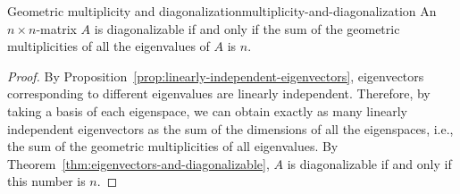 \begin{proposition}{Geometric multiplicity and diagonalization}{multiplicity-and-diagonalization}
  An $n\times n$-matrix $A$ is diagonalizable if and only if the sum
  of the geometric multiplicities of all the eigenvalues of $A$ is
  $n$.
\end{proposition}

\begin{proof}
  By Proposition~\ref{prop:linearly-independent-eigenvectors},
  eigenvectors corresponding to different eigenvalues are linearly
  independent. Therefore, by taking a basis of each eigenspace, we can
  obtain exactly as many linearly independent eigenvectors as the sum
  of the dimensions of all the eigenspaces, i.e., the sum of the
  geometric multiplicities of all eigenvalues. By
  Theorem~\ref{thm:eigenvectors-and-diagonalizable}, $A$ is
  diagonalizable if and only if this number is $n$.
\end{proof}

